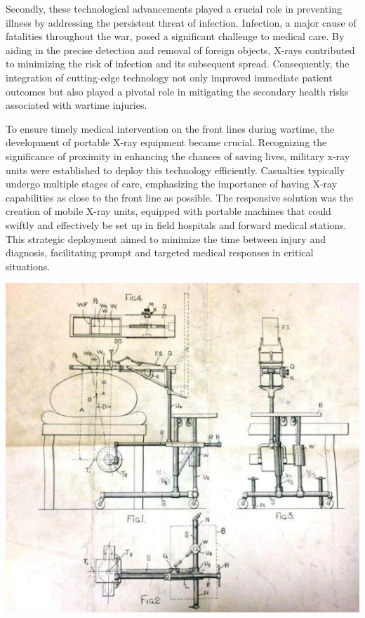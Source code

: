 \documentclass[a4paper,12pt]{report}
\begin{document}
Secondly, these technological advancements played a crucial role in preventing illness by
addressing the persistent threat of infection. Infection, a major cause of fatalities throughout the
war, posed a significant challenge to medical care. By aiding in the precise detection and removal
of foreign objects, X-rays contributed to minimizing the risk of infection and its subsequent
spread. Consequently, the integration of cutting-edge technology not only improved immediate
patient outcomes but also played a pivotal role in mitigating the secondary health risks associated
with wartime injuries.

To ensure timely medical intervention on the front lines during wartime, the development of
portable X-ray equipment became crucial. Recognizing the significance of proximity in
enhancing the chances of saving lives, military x-ray units were established to deploy this
technology efficiently. Casualties typically undergo multiple stages of care, emphasizing the
importance of having X-ray capabilities as close to the front line as possible. The responsive
solution was the creation of mobile X-ray units, equipped with portable machines that could
swiftly and effectively be set up in field hospitals and forward medical stations. This strategic
deployment aimed to minimize the time between injury and diagnosis, facilitating prompt and
targeted medical responses in critical situations.

\begin{center}
  \includegraphics[scale = 0.7]{drawing.png}
  \label{drawing}
\end{center}
\end{document}
